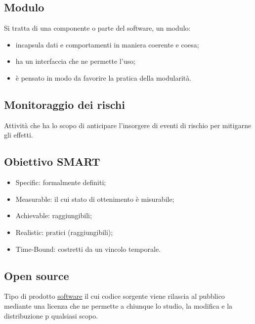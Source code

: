 	
	\subsection{Modulo}
	\label{sec:modulo}
	Si tratta di una componente o parte del software, un modulo:
	\begin{itemize}
	\item incapsula dati e comportamenti in maniera coerente e coesa;
	\item ha un interfaccia che ne permette l'uso;
	\item è pensato in modo da favorire la pratica della modularità.
	\end{itemize}
	
	
	\subsection{Monitoraggio dei rischi}
	\label{sec:monitoraggiorischi}
	Attività che ha lo scopo di anticipare l'insorgere di eventi di rischio per mitigarne gli effetti.	
	

	\newpage

	\subsection{Obiettivo SMART}
	\label{sec:smart}
	\begin{itemize}
			\item Specific: formalmente definiti;
			\item Measurable: il cui stato di ottenimento è misurabile;
			\item Achievable: raggiungibili;
			\item Realistic: pratici (raggiungibili);
			\item Time-Bound: costretti da un vincolo temporale.
		\end{itemize}


		
	\subsection{Open source}
	\label{sec:opensource}
	Tipo di prodotto \underline{\hyperref[sec:prodottosoftware]{software}} il cui codice sorgente viene rilascia	al pubblico mediante una licenza che ne permette a chiunque lo studio, la modifica e la distribuzione p	qualsiasi scopo.
		

	\newpage


